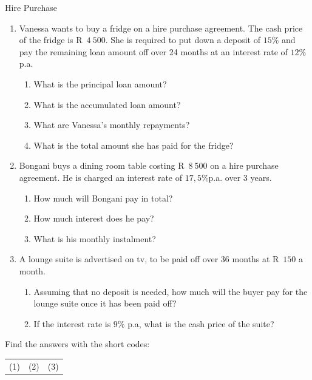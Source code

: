 \begin{exercises}{Hire Purchase}
    \begin{enumerate}[label=\textbf{\arabic*}.]
	\item Vanessa wants to buy a fridge on a hire purchase agreement. The cash price of the fridge is R~$4~500$. She is required to put down a deposit of $15\%$ and pay the remaining loan amount off over 24 months at an interest rate of $12\%$ p.a.
	\begin{enumerate}[noitemsep, label=\textbf{(\alph*)} ]
	    \item What is the principal loan amount?
	    \item What is the accumulated loan amount?
	    \item What are Vanessa’s monthly repayments?
	    \item What is the total amount she has paid for the fridge?
	\end{enumerate}


	\item Bongani buys a dining room table costing R~$8~500$ on a hire purchase agreement. He is charged an interest rate of $17,5\%$p.a. over 3 years.
	\begin{enumerate}[noitemsep, label=\textbf{(\alph*)} ]
	    \item How much will Bongani pay in total?
	    \item How much interest does he pay?
	    \item What is his monthly instalment?
	\end{enumerate}

	\item A lounge suite is advertised on tv, to be paid off over 36 months at R~$150$ a month.
	\begin{enumerate}[noitemsep, label=\textbf{(\alph*)} ]
	    \item Assuming that no deposit is needed, how much will the buyer pay for the lounge suite once it has been paid off?
	    \item If the interest rate is $9\%$ p.a, what is the cash price of the suite?\\
	\end{enumerate}
    \end{enumerate}

    Find the answers with the short codes:\\
    \begin{tabularx}{\textwidth}{ XXX }
	(1)	&	(2)	&	(3)\\
    \end{tabularx}
\end{exercises}



